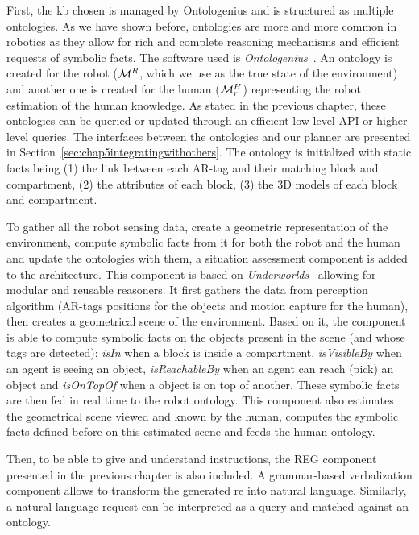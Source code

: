 \documentclass[a4paper,11pt,twoside]{StyleThese}
\begin{document}
First, the \acrlong{kb} chosen is managed by Ontologenius and is structured as multiple ontologies. As we have shown before, ontologies are more and more common in robotics as they allow for rich and complete reasoning mechanisms and efficient requests of symbolic facts. The software used is \textit{Ontologenius}~\cite{sarthou2019ontologenius}. An ontology is created for the robot ($\mathcal{M}^R$, which we use as the true state of the environment) and another one is created for the human ($\mathcal{M}^H_r$) representing the robot estimation of the human knowledge. As stated in the previous chapter, these ontologies can be queried or updated through an efficient low-level API or higher-level \sparql{} queries. The interfaces between the ontologies and our planner are presented in Section~\ref{sec:chap5integratingwithothers}. The ontology is initialized with static facts being (1) the link between each AR-tag and their matching block and compartment, (2) the attributes of each block, (3) the 3D models of each block and compartment.

To gather all the robot sensing data, create a geometric representation of the environment, compute symbolic facts from it for both the robot and the human and update the ontologies with them, a situation assessment component is added to the architecture. This component is based on \textit{Underworlds}~\cite{lemaignan2018underworlds} allowing for modular and reusable reasoners. It first gathers the data from perception algorithm (AR-tags positions for the objects and motion capture for the human), then creates a geometrical scene of the environment. Based on it, the component is able to compute symbolic facts on the objects present in the scene (and whose tags are detected): \textit{isIn} when a block is inside a compartment, \textit{isVisibleBy} when an agent is seeing an object, \textit{isReachableBy} when an agent can reach (pick) an object and \textit{isOnTopOf} when a object is on top of another. These symbolic facts are then fed in real time to the robot ontology. This component also estimates the geometrical scene viewed and known by the human, computes the symbolic facts defined before on this estimated scene and feeds the human ontology.

Then, to be able to give and understand instructions, the REG component presented in the previous chapter is also included. A grammar-based verbalization component allows to transform the generated \acrshort{re} into natural language. Similarly, a natural language request can be interpreted as a \sparql{} query and matched against an ontology.
\end{document}
